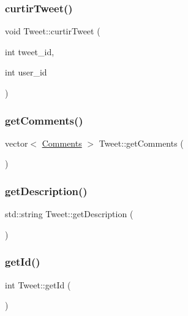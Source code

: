\mbox{\label{class_tweet_a77af03b416c030006b97482676c03c81}} 
\subsubsection{\texorpdfstring{curtir\+Tweet()}{curtirTweet()}}
{\footnotesize\ttfamily void Tweet\+::curtir\+Tweet (\begin{DoxyParamCaption}\item[{int}]{tweet\+\_\+id,  }\item[{int}]{user\+\_\+id }\end{DoxyParamCaption})}

\mbox{\label{class_tweet_a72649ed74508f540d7b0a1a48fd5313c}} 
\subsubsection{\texorpdfstring{get\+Comments()}{getComments()}}
{\footnotesize\ttfamily vector$<$ \hyperlink{class_comments}{Comments} $>$ Tweet\+::get\+Comments (\begin{DoxyParamCaption}{ }\end{DoxyParamCaption})}

\mbox{\label{class_tweet_a3e4e7abc45486860373cd3fa146f1366}} 
\subsubsection{\texorpdfstring{get\+Description()}{getDescription()}}
{\footnotesize\ttfamily std\+::string Tweet\+::get\+Description (\begin{DoxyParamCaption}{ }\end{DoxyParamCaption})}

\mbox{\label{class_tweet_afe4722f5b4d276f36cef27989e9ecbc3}} 
\subsubsection{\texorpdfstring{get\+Id()}{getId()}}
{\footnotesize\ttfamily int Tweet\+::get\+Id (\begin{DoxyParamCaption}{ }\end{DoxyParamCaption})}

